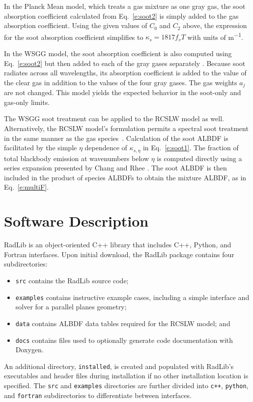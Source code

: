 \documentclass[preprint,12pt]{elsarticle}
\newcounter{bla}
\begin{document}
In the Planck Mean model, which treats a gas mixture as one gray gas, the soot absorption coefficient calculated from Eq.~\ref{e:soot2} is simply added to the gas absorption coefficient. Using the given values of $C_0$ and $C_2$ above, the expression for the soot absorption coefficient simplifies to  $\kappa_s=1817f_vT$ with units of \si{m^{-1}}.

In the WSGG model, the soot absorption coefficient is also computed using Eq.~\ref{e:soot2} but then added to each of the gray gases separately \cite{Bordbar_personal}. Because soot radiates across all wavelengths, its absorption coefficient is added to the value of the clear gas in addition to the values of the four gray gases. The gas weights $a_j$ are not changed. This model yields the expected behavior in the soot-only and gas-only limits.

The WSGG soot treatment can be applied to the RCSLW model as well. Alternatively, the RCSLW model's formulation permits a spectral soot treatment in the same manner as the gas species~\cite{Solovjov_2001}. Calculation of the soot ALBDF is facilitated by the simple $\eta$ dependence of $\kappa_{s,\eta}$ in Eq.~\ref{e:soot1}. The fraction of total blackbody emission at wavenumbers below $\eta$ is computed directly using a series expansion presented by Chang and Rhee \cite{Chang_1984}. The soot ALBDF is then included in the product of species ALBDFs to obtain the mixture ALBDF, as in Eq.~\ref{e:multiF}.




\section{Software Description} \label{s:architechture}

RadLib is an object-oriented C++ library that includes C++, Python, and Fortran interfaces. Upon initial download, the RadLib package contains four subdirectories:
%
\begin{itemize}
    \item \texttt{src} contains the RadLib source code;
    \item \texttt{examples} contains instructive example cases, including a simple interface and solver for a parallel planes geometry;
    \item \texttt{data} contains ALBDF data tables required for the RCSLW model; and
    \item \texttt{docs} contains files used to optionally generate code documentation with Doxygen.
\end{itemize}
%
An additional directory, \texttt{installed}, is created and populated with RadLib's executables and header files during installation if no other installation location is specified.
The \texttt{src} and \texttt{examples} directories are further divided into \texttt{c++}, \texttt{python}, and \texttt{fortran} subdirectories to differentiate between interfaces.
\end{document}
